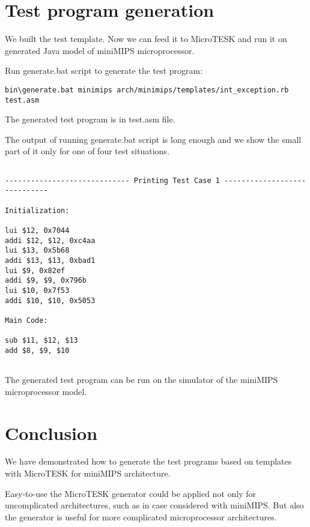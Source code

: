 \documentclass[oneside,final,12pt]{extreport}
\begin{document}
\bigskip

\newpage

\section*{Test program generation }


\bigskip

We built the test template. Now we can feed it to MicroTESK and run it on generated Java model of miniMIPS microprocessor. 


\bigskip

Run generate.bat script to generate the test program:

\begin{verbatim}
bin\generate.bat minimips arch/minimips/templates/int_exception.rb test.asm
\end{verbatim}

\bigskip

The generated test program is in test.asm file.

\bigskip

The output of running generate.bat script is long enough and we show the small part of it only for one of four test situations.


\begin{verbatim}

----------------------------- Printing Test Case 1 -----------------------------

Initialization:

lui $12, 0x7044
addi $12, $12, 0xc4aa
lui $13, 0x5b68
addi $13, $13, 0xbad1
lui $9, 0x82ef
addi $9, $9, 0x796b
lui $10, 0x7f53
addi $10, $10, 0x5053

Main Code:

sub $11, $12, $13
add $8, $9, $10


\end{verbatim}

\bigskip

The generated test program can be run on the simulator of the miniMIPS microprocessor model.

\bigskip

\newpage

\section*{Conclusion}

\bigskip

We have demonstrated how to generate the test programs based on templates with MicroTESK for miniMIPS architecture.

Easy-to-use the MicroTESK generator could be applied not only for uncomplicated architectures, such as in case considered with miniMIPS. But also the generator is useful for more complicated microprocessor architectures. 
\end{document}

